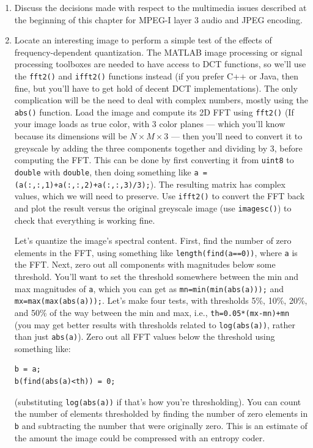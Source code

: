 \begin{enumerate}
\item Discuss the decisions made with respect to the multimedia issues
described at the beginning of this chapter for MPEG-I layer 3 audio
and JPEG encoding.

\item Locate an interesting image to perform a simple test of the
effects of frequency-dependent quantization. The MATLAB image
processing or signal processing toolboxes are needed to have access to
DCT functions, so we'll use the \verb|fft2()| and \verb|ifft2()|
functions instead (if you prefer C++ or Java, then fine, but you'll
have to get hold of decent DCT implementations). The only complication 
will be the need to deal with complex numbers, mostly using the
\verb|abs()| function.
Load the image and compute its 2D FFT using \verb|fft2()| (If your
image loads as true color, with 3 color planes --- which you'll know
because its dimensions will be $N \times M \times 3$ --- then you'll
need to convert it to greyscale by adding the three components
together and dividing by 3, before computing the FFT. This can be done
by first converting it from \verb|uint8| to \verb|double| with
\verb|double|, then doing something like
\verb|a = (a(:,:,1)+a(:,:,2)+a(:,:,3)/3);|). The resulting matrix has
complex values, which we will need to preserve. Use \verb|ifft2()| to
convert the FFT back and plot the result versus the original greyscale
image (use \verb|imagesc()|) to check that everything is working fine.

Let's quantize the image's spectral content.  First, find the number
of zero elements in the FFT, using something like
\verb|length(find(a==0))|, where \verb|a| is the FFT. Next, zero out
all components with magnitudes below some threshold. You'll want to
set the threshold somewhere between the min and max magnitudes of
\verb|a|, which you can get as \verb|mn=min(min(abs(a)));| and
\verb|mx=max(max(abs(a)));|. Let's make four tests, with thresholds
5\%, 10\%, 20\%, and 50\% of the way between the min and max, i.e.,
\verb|th=0.05*(mx-mn)+mn| (you may get better results with thresholds
related to \verb|log(abs(a))|, rather than just \verb|abs(a)|). Zero
out all FFT values below the threshold using something like:
\begin{verbatim}
b = a;
b(find(abs(a)<th)) = 0;
\end{verbatim}
(substituting \verb|log(abs(a))| if that's how you're thresholding).
You can count the number of elements thresholded by finding the number 
of zero elements in \verb|b| and subtracting the number that were
originally zero. This is an estimate of the amount the image could be
compressed with an entropy coder.


\end{enumerate}
